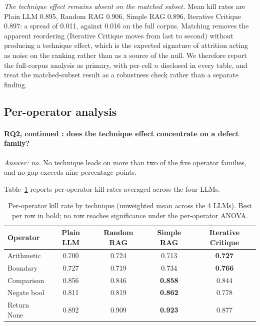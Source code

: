 \documentclass[smallextended]{svjour3}
\begin{document}
\emph{The technique effect remains absent on the matched subset.} Mean
kill rates are Plain LLM 0.895, Random RAG 0.906, Simple RAG 0.896,
Iterative Critique 0.897: a spread of 0.011, against 0.016 on the
full corpus. Matching removes the apparent reordering (Iterative
Critique moves from last to second) without producing a technique
effect, which is the expected signature of attrition acting as
noise on the ranking rather than as a source of the null. We
therefore report the full-corpus analysis as primary, with per-cell
$n$ disclosed in every table, and treat the matched-subset result as
a robustness check rather than a separate finding.

\subsection{Per-operator analysis}\label{sec:results-peroperator}

\paragraph{\textnormal{\textbf{RQ2}, continued : does the technique effect concentrate on a defect family?}}
\emph{Answer: no.} No technique leads on more than two of the five
operator families, and no gap exceeds nine percentage points.


Table~\ref{tab:peroperator} reports per-operator kill rates averaged
across the four LLMs.

\begin{table}[t]
\centering
\caption{Per-operator kill rate by technique (unweighted mean across the 4 LLMs). Best per row in bold; no row reaches significance under the per-operator ANOVA.}
\label{tab:peroperator}
\begin{tabular}{@{}lcccc@{}}
\toprule
Operator & Plain LLM & Random RAG & Simple RAG & Iterative Critique \\
\midrule
Arithmetic & 0.700 & 0.724 & 0.713 & \textbf{0.727} \\
Boundary & 0.727 & 0.719 & 0.734 & \textbf{0.766} \\
Comparison & 0.856 & 0.846 & \textbf{0.858} & 0.844 \\
Negate bool & 0.811 & 0.819 & \textbf{0.862} & 0.778 \\
Return None & 0.892 & 0.909 & \textbf{0.923} & 0.877 \\
\bottomrule
\end{tabular}
\end{table}
\end{document}
